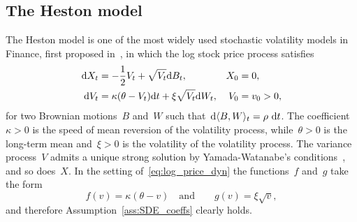 \subsection{The Heston model}\label{sec:Heston}

The Heston model is one of the most widely used stochastic volatility models in Finance, first proposed in~\cite{Heston1993AOptions}, in which the log stock price process satisfies
\begin{equation}\label{eq:Heston}
\begin{aligned}
    \mathrm{d} X_t &= -\frac12 V_t + \sqrt{V_t}\mathrm{d} B_t, & X_0 &= 0,\\
    \mathrm{d} V_t &= \kappa (\theta - V_t)\mathrm{d} t + \xi \sqrt{V_t}\mathrm{d} W_t, & V_0 &= v_0 > 0,
\end{aligned}
\end{equation}
for two Brownian motions~$B$ and~$W$
such that~$\D\langle B, W\rangle_{t} = \rho \ \D t$. 
The coefficient~$\kappa>0$ is the speed of mean reversion of the volatility process, 
while~$\theta>0$ is the long-term mean 
and~$\xi>0$ is the volatility of the volatility process.
The variance process~$V$ admits a unique strong solution by Yamada-Watanabe's conditions~\cite[Proposition 2.13]{Karatzas2012BrownianCalculus}, and so does~$X$.
In the setting of~\eqref{eq:log_price_dyn}
the functions~$f$ and~$g$ take the form
$$
f(v) = \kappa(\theta - v)
\quad\text{and}\qquad
g(v) = \xi\sqrt{v},
$$
and therefore Assumption~\ref{ass:SDE_coeffs} clearly holds.
